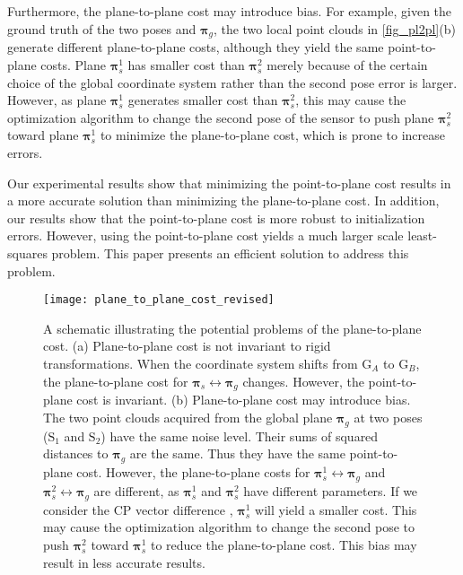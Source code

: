 \documentclass{vgtc}                          %
\begin{document}
Furthermore, the plane-to-plane cost may introduce bias. For example, given the ground truth of  the two poses and $\bm{\pi}_g$, the two local point clouds in  \autoref{fig_pl2pl}(b)   generate different plane-to-plane costs, although they yield the same point-to-plane costs. Plane $\bm{\pi}_{s}^{1}$  has smaller cost than $\bm{\pi}_{s}^{2}$ merely because of  the certain choice of the global coordinate system rather than the second pose error is larger. However, as plane $\bm{\pi}_{s}^{1}$  generates smaller cost than $\bm{\pi}_{s}^{2}$,  %
this may cause  the optimization algorithm to change the second pose of the sensor to push  plane $\bm{\pi}_{s}^{2}$   toward plane $\bm{\pi}_{s}^{1}$  to minimize the plane-to-plane cost, which is prone to increase errors.

Our experimental results show that minimizing the point-to-plane cost results in a more accurate solution than  minimizing  the plane-to-plane cost. In addition, our results show that the point-to-plane cost is more robust to initialization errors.  However, using the point-to-plane cost yields a much larger scale least-squares problem. This paper presents an efficient solution to address this problem.

\begin{figure}[tb]
	\centering %
	\texttt{[image: plane\_to\_plane\_cost\_revised]}
	\caption{A schematic illustrating the potential problems of the plane-to-plane
		cost. (a) Plane-to-plane cost is not invariant to rigid transformations. When the coordinate system shifts from $\text{G}_A$ to $\text{G}_B$, the plane-to-plane cost for $\bm{\pi}_{s}\leftrightarrow \bm{\pi}_{g}$ changes. However, the point-to-plane cost is invariant.
		(b) Plane-to-plane cost may introduce bias. The two point clouds acquired from the global plane $\bm{\pi}_{g}$ at two poses ($\text{S}_1$ and $\text{S}_2$) have the same noise level. Their sums of squared distances to $\bm{\pi}_{g}$ are the same. Thus they have the same point-to-plane cost. However, the plane-to-plane costs for $\bm{\pi}_{s}^1 \leftrightarrow \bm{\pi}_{g}$  and $\bm{\pi}_{s}^2 \leftrightarrow \bm{\pi}_{g}$ are different, as  $\bm{\pi}_{s}^{1}$ and $\bm{\pi}_{s}^{2}$ have different parameters. If we consider the CP vector difference \cite{geneva2018lips}, $\bm{\pi}_{s}^1 $ will yield a smaller cost. This may cause the optimization algorithm to change the second pose  to push $\bm{\pi}_{s}^2 $ toward $\bm{\pi}_{s}^1 $ to reduce the plane-to-plane cost. This bias may result in less accurate results.}
	\label{fig_pl2pl} 
\end{figure}
\end{document}
